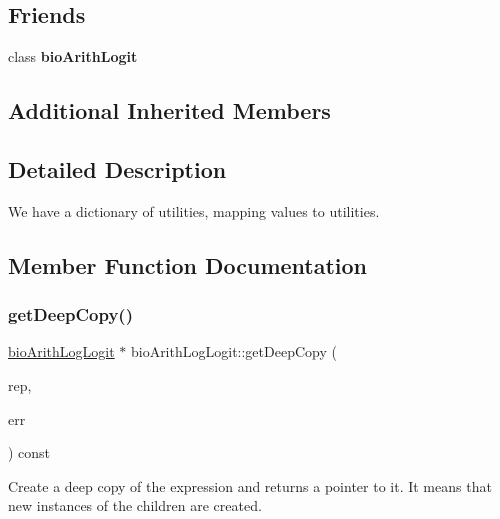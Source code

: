 \subsection*{Friends}
\begin{DoxyCompactItemize}
\item 
\mbox{\label{classbio_arith_log_logit_ad8f22d5ea704665333fe3e15cb1cc293}} 
class {\bfseries bio\+Arith\+Logit}
\end{DoxyCompactItemize}
\subsection*{Additional Inherited Members}


\subsection{Detailed Description}
We have a dictionary of utilities, mapping values to utilities. 

\subsection{Member Function Documentation}
\mbox{\label{classbio_arith_log_logit_a95be99c67edc6920cea644dcf14c2775}} 
\subsubsection{\texorpdfstring{get\+Deep\+Copy()}{getDeepCopy()}}
{\footnotesize\ttfamily \hyperlink{classbio_arith_log_logit}{bio\+Arith\+Log\+Logit} $\ast$ bio\+Arith\+Log\+Logit\+::get\+Deep\+Copy (\begin{DoxyParamCaption}\item[{\hyperlink{classbio_expression_repository}{bio\+Expression\+Repository} $\ast$}]{rep,  }\item[{pat\+Error $\ast$\&}]{err }\end{DoxyParamCaption}) const\hspace{0.3cm}{\ttfamily [virtual]}}

Create a deep copy of the expression and returns a pointer to it. It means that new instances of the children are created. 

